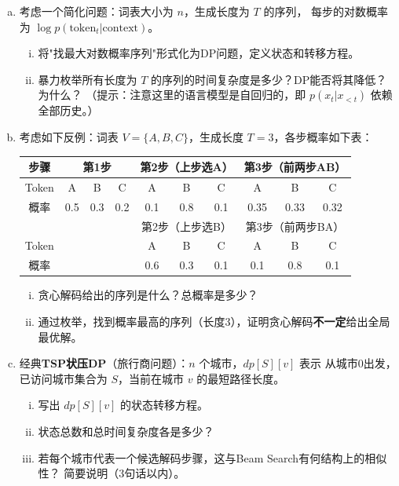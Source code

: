 \documentclass[12pt, a4paper]{ctexart}
\begin{document}
\begin{enumerate}[(a)]
    \item 考虑一个简化问题：词表大小为 $n$，生成长度为 $T$ 的序列，
    每步的对数概率为 $\log p(\text{token}_t | \text{context})$。
    \begin{enumerate}[i.]
        \item 将"找最大对数概率序列"形式化为DP问题，定义状态和转移方程。
        \item 暴力枚举所有长度为 $T$ 的序列的时间复杂度是多少？DP能否将其降低？为什么？
        （提示：注意这里的语言模型是自回归的，即 $p(x_t | x_{<t})$ 依赖全部历史。）
    \end{enumerate}

    \item 考虑如下反例：词表 $V = \{A, B, C\}$，生成长度 $T=3$，各步概率如下表：

    \begin{center}
    \begin{tabular}{c|ccc|ccc|ccc}
    \toprule
    步骤 & \multicolumn{3}{c|}{第1步} & \multicolumn{3}{c|}{第2步（上步选A）} & \multicolumn{3}{c}{第3步（前两步AB）} \\
    \midrule
    Token & A & B & C & A & B & C & A & B & C \\
    概率   & 0.5 & 0.3 & 0.2 & 0.1 & 0.8 & 0.1 & 0.35 & 0.33 & 0.32 \\
    \midrule
    & \multicolumn{3}{c|}{} & \multicolumn{3}{c|}{第2步（上步选B）} & \multicolumn{3}{c}{第3步（前两步BA）} \\
    \midrule
    Token & & & & A & B & C & A & B & C \\
    概率   & & & & 0.6 & 0.3 & 0.1 & 0.1 & 0.8 & 0.1 \\
    \bottomrule
    \end{tabular}
    \end{center}

    \begin{enumerate}[i.]
        \item 贪心解码给出的序列是什么？总概率是多少？
        \item 通过枚举，找到概率最高的序列（长度3），证明贪心解码\textbf{不一定}给出全局最优解。
    \end{enumerate}

    \item 经典\textbf{TSP状压DP}（旅行商问题）：$n$ 个城市，$dp[S][v]$ 表示
    从城市0出发，已访问城市集合为 $S$，当前在城市 $v$ 的最短路径长度。
    \begin{enumerate}[i.]
        \item 写出 $dp[S][v]$ 的状态转移方程。
        \item 状态总数和总时间复杂度各是多少？
        \item 若每个城市代表一个候选解码步骤，这与Beam Search有何结构上的相似性？
        简要说明（3句话以内）。
    \end{enumerate}
\end{enumerate}
\end{document}
